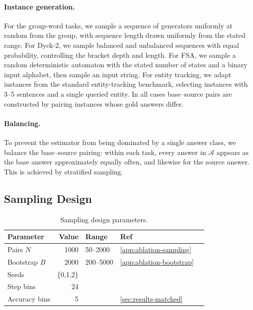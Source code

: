 \documentclass[11pt]{article}
\begin{document}
\paragraph{Instance generation.}
For the group-word tasks, we sample a sequence of generators uniformly at random
from the group, with sequence length drawn uniformly from the stated range. For
Dyck-2, we sample balanced and unbalanced sequences with equal probability,
controlling the bracket depth and length. For FSA, we sample a random
deterministic automaton with the stated number of states and a binary input
alphabet, then sample an input string. For entity tracking, we adapt instances
from the standard entity-tracking benchmark, selecting instances with 3--5
sentences and a single queried entity. In all cases base--source pairs are
constructed by pairing instances whose gold answers differ.

\paragraph{Balancing.}
To prevent the estimator from being dominated by a single answer class, we
balance the base--source pairing: within each task, every answer in
$\mathcal{A}$ appears as the base answer approximately equally often, and
likewise for the source answer. This is achieved by stratified sampling.

\subsection{Sampling Design}
\label{app:exp-sampling}

\begin{table}[t]
\centering\small
\setlength{\tabcolsep}{3pt}
\begin{tabular}{@{}lrlll@{}}
\toprule
Parameter & Value & Range & Ref \\
\midrule
Pairs $N$       & 1000 & 50--2000 & \cref{app:ablation-sampling} \\
Bootstrap $B$   & 2000 & 200--5000 & \cref{app:ablation-bootstrap} \\
Seeds           & \{0,1,2\} & & \\
Step bins       & 24 & & \\
Accuracy bins   & 5 & & \cref{sec:results-matched} \\
\bottomrule
\end{tabular}
\caption{Sampling design parameters. }
\label{tab:sampling-design}
\end{table}
\end{document}
